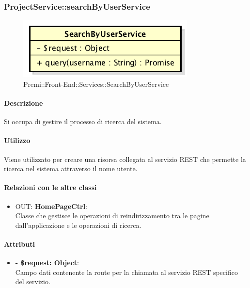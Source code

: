 		
		\subsubsection{ProjectService::searchByUserService}
		\begin{figure}[h]
			\centering
				\includegraphics[width=0.4\linewidth]{img/premi_front_end_services_searchbyuserservice}
			\caption[Premi::Front-End::Services::SearchByUserService]{Premi::Front-End::Services::SearchByUserService}
		\end{figure}
		
		\paragraph{Descrizione}
		Si occupa di gestire il processo di ricerca del sistema.
		
		\paragraph{Utilizzo}
		Viene utilizzato per creare una risorsa collegata al servizio \gls{REST} che permette la ricerca nel sistema attraverso il nome utente.
		
		\paragraph{Relazioni con le altre classi}
		\begin{itemize}
			\item OUT: \textbf{HomePageCtrl}:\\
			Classe che gestisce le operazioni di reindirizzamento tra le pagine dall'applicazione e le operazioni di ricerca.
		\end{itemize}
		
		\paragraph{Attributi}
		\begin{itemize}
			\item \textbf{- \$request: Object}:\\
			Campo dati contenente la route per la chiamata al servizio \gls{REST} specifico del servizio.
		\end{itemize}	
		
